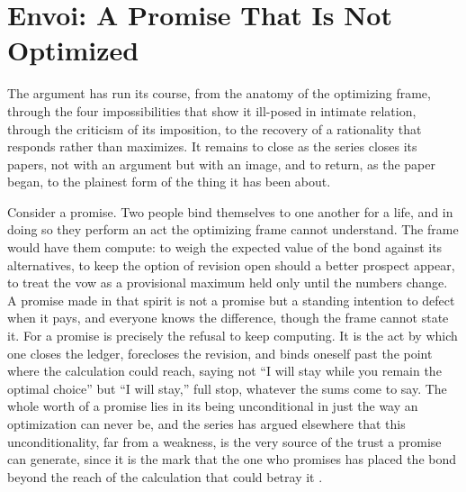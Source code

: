\section{Envoi: A Promise That Is Not Optimized}
\label{p25:sec:envoi}

\noindent
The argument has run its course, from the anatomy of the optimizing frame, through the four impossibilities that show it ill-posed in intimate relation, through the criticism of its imposition, to the recovery of a rationality that responds rather than maximizes. It remains to close as the series closes its papers, not with an argument but with an image, and to return, as the paper began, to the plainest form of the thing it has been about.

Consider a promise. Two people bind themselves to one another for a life, and in doing so they perform an act the optimizing frame cannot understand. The frame would have them compute: to weigh the expected value of the bond against its alternatives, to keep the option of revision open should a better prospect appear, to treat the vow as a provisional maximum held only until the numbers change. A promise made in that spirit is not a promise but a standing intention to defect when it pays, and everyone knows the difference, though the frame cannot state it. For a promise is precisely the refusal to keep computing. It is the act by which one closes the ledger, forecloses the revision, and binds oneself past the point where the calculation could reach, saying not ``I will stay while you remain the optimal choice'' but ``I will stay,'' full stop, whatever the sums come to say. The whole worth of a promise lies in its being unconditional in just the way an optimization can never be, and the series has argued elsewhere that this unconditionality, far from a weakness, is the very source of the trust a promise can generate, since it is the mark that the one who promises has placed the bond beyond the reach of the calculation that could betray it \parencite{paperxiii}.

